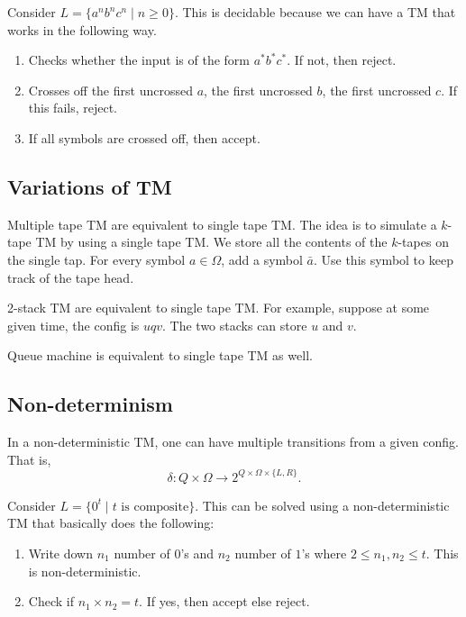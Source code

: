 \documentclass{article}
\begin{document}
Consider $L = \{a^nb^nc^n \mid n \geq 0\}$. This is decidable because we can have a TM that works in the following way.
\begin{enumerate}
\item\label{item:53} Checks whether the input is of the form $a^{*}b^{*}c^{*}$. If not, then reject. 
\item\label{item:54} Crosses off the first uncrossed $a$, the first uncrossed $b$, the first uncrossed $c$. If this fails, reject. 
\item\label{item:55} If all symbols are crossed off, then accept.
\end{enumerate}

\subsection{Variations of TM}

Multiple tape TM are equivalent to single tape TM. The idea is to simulate a $k$-tape TM by using a single tape TM. We store all the contents of the $k$-tapes on the single tap. For every symbol $a \in \Omega$, add a symbol $\bar{a}$. Use this symbol to keep track of the tape head.

2-stack TM are equivalent to single tape TM. For example, suppose at some given time, the config is $uqv$. The two stacks can store $u$ and $v$.

Queue machine is equivalent to single tape TM as well.

\subsection{Non-determinism}

In a non-deterministic TM, one can have multiple transitions from a given config. That is, 
\begin{displaymath}
  \delta: Q \times \Omega \to 2^{Q \times \Omega \times \{L, R\}}.
\end{displaymath}

Consider $L = \{ 0^t \mid t \text{ is composite} \}$. This can be solved using a non-deterministic TM that basically does the following: 
\begin{enumerate}
\item\label{item:58} Write down $n_1$ number of $0$'s and $n_2$ number of $1$'s where $2 \leq n_1, n_2 \leq t$. This is non-deterministic.
\item\label{item:59} Check if $n_1 \times n_2 = t$. If yes, then accept else reject.
\end{enumerate}
\end{document}
